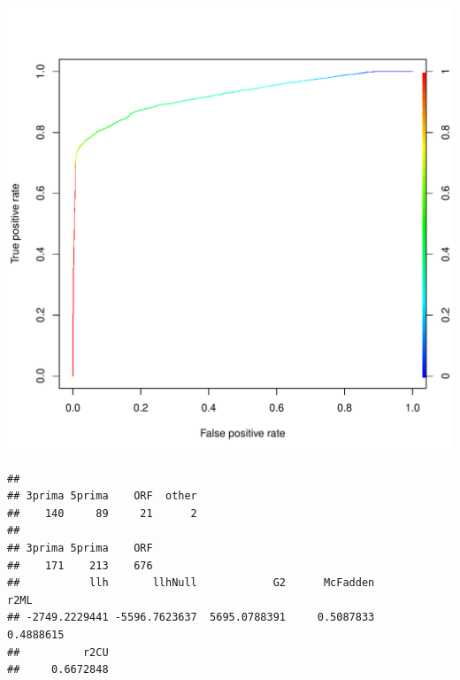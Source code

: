 \documentclass{article}\usepackage[]{graphicx}\usepackage[]{color}
\makeatletter
\def\maxwidth{ %
  \ifdim\Gin@nat@width>\linewidth
    \linewidth
  \else
    \Gin@nat@width
  \fi
}
\newenvironment{kframe}{%
 \def\at@end@of@kframe{}%
 \ifinner\ifhmode%
  \def\at@end@of@kframe{\end{minipage}}%
  \begin{minipage}{\columnwidth}%
 \fi\fi%
 \def\FrameCommand##1{\hskip\@totalleftmargin \hskip-\fboxsep
 \colorbox{shadecolor}{##1}\hskip-\fboxsep
     \hskip-\linewidth \hskip-\@totalleftmargin \hskip\columnwidth}%
 \MakeFramed {\advance\hsize-\width
   \@totalleftmargin\z@ \linewidth\hsize
   \@setminipage}}%
 {\par\unskip\endMakeFramed%
 \at@end@of@kframe}
\newenvironment{knitrout}{}{} %
\makeatother
\begin{document}
\begin{knitrout}
\begin{kframe}
{\ttfamily\noindent\itshape\color{messagecolor}{\#\# \\\#\# Attaching package: 'gplots'}}

{\ttfamily\noindent\itshape\color{messagecolor}{\#\# The following object is masked from 'package:stats':\\\#\# \\\#\#\ \ \ \  lowess}}\end{kframe}
\includegraphics[width=\maxwidth]{figure/model-1} 
\begin{kframe}\begin{verbatim}
## 
## 3prima 5prima    ORF  other 
##    140     89     21      2
## 
## 3prima 5prima    ORF 
##    171    213    676
##           llh       llhNull            G2      McFadden          r2ML 
## -2749.2229441 -5596.7623637  5695.0788391     0.5087833     0.4888615 
##          r2CU 
##     0.6672848
\end{verbatim}
\end{kframe}
\end{knitrout}
\end{document}
